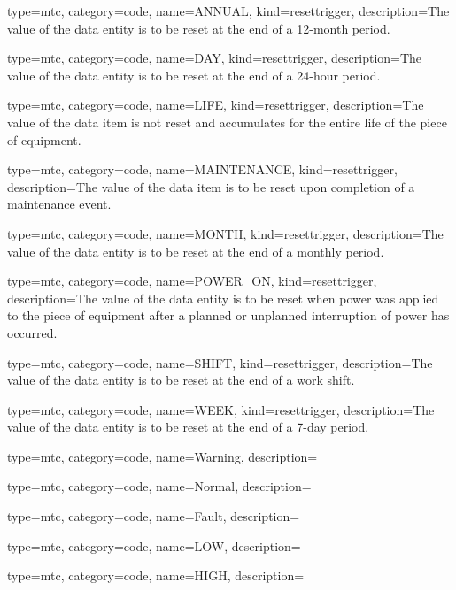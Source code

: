 {
  type=mtc,
  category=code,
  name={ANNUAL},
  kind={resettrigger},
  description={The value of the \gls{data entity} is to be reset at the end of a 12-month period.}
}


{
  type=mtc,
  category=code,
  name={DAY},
  kind={resettrigger},
  description={The value of the \gls{data entity} is to be reset at the end of a 24-hour period.}
}


{
  type=mtc,
  category=code,
  name={LIFE},
  kind={resettrigger},
  description={The value of the data item is not reset and accumulates for the entire life of the piece of equipment.}
}


{
  type=mtc,
  category=code,
  name={MAINTENANCE},
  kind={resettrigger},
  description={The value of the data item is to be reset upon completion of a maintenance event.}
}


{
  type=mtc,
  category=code,
  name={MONTH},
  kind={resettrigger},
  description={The value of the \gls{data entity} is to be reset at the end of a monthly period.}
}


{
  type=mtc,
  category=code,
  name={POWER\_ON},
  kind={resettrigger},
  description={The value of the \gls{data entity} is to be reset when power was applied to the piece of equipment after a planned or unplanned interruption of power has occurred.}
}


{
  type=mtc,
  category=code,
  name={SHIFT},
  kind={resettrigger},
  description={The value of the \gls{data entity} is to be reset at the end of a work shift.}
}


{
  type=mtc,
  category=code,
  name={WEEK},
  kind={resettrigger},
  description={The value of the \gls{data entity} is to be reset at the end of a 7-day period.}
}


{
  type=mtc,
  category=code,
  name={Warning},
  description={}
}


{
  type=mtc,
  category=code,
  name={Normal},
  description={}
}


{
  type=mtc,
  category=code,
  name={Fault},
  description={}
}


{
  type=mtc,
  category=code,
  name={LOW},
  description={}
}


{
  type=mtc,
  category=code,
  name={HIGH},
  description={}
}


